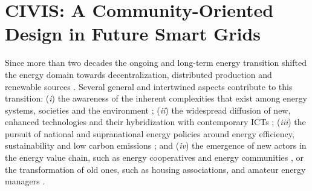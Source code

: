 \section{CIVIS: A Community-Oriented Design in Future Smart Grids}
\label{sec:civis}

Since more than two decades the ongoing and long-term energy transition shifted the energy domain
towards decentralization, distributed production and renewable sources \cite{rifkin_third_2011,sovacool_how_2016}. Several general and intertwined aspects contribute to this transition: 
(\textit{i}) the awareness of the inherent complexities that exist among energy systems, societies 
and the environment \cite{bulkeley_bringing_2012,umbach_global_2010}; (\textit{ii}) the
widespread diffusion of new, enhanced technologies and their hybridization with contemporary ICTs 
\cite{putrus_smart_2013,schick_innovating_2013}; (\textit{iii}) the pursuit of national and 
supranational energy policies around energy efficiency, sustainability and low carbon emissions 
\cite{da_graca_carvalho_eu_2012}; and (\textit{iv}) the emergence of new actors in the energy value 
chain, such as energy cooperatives and energy communities \cite{viardot_role_2013}, or the 
transformation of old ones, such as housing associations, and amateur energy managers 
\cite{hasselqvist_linking_2016}.

